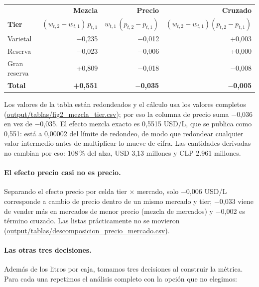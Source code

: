\begin{center}
\small
\begin{tabular}{l r r r}
\hline
& \textbf{Mezcla} & \textbf{Precio} & \textbf{Cruzado} \\
\textbf{Tier} & $(w_{t,2} - w_{t,1})\, p_{t,1}$ & $w_{t,1}\,(p_{t,2} - p_{t,1})$ & $(w_{t,2} - w_{t,1})(p_{t,2} - p_{t,1})$ \\
\hline
Varietal     & $-$0,235 & $-$0,012 & +0,003 \\
Reserva      & $-$0,023 & $-$0,006 & +0,000 \\
Gran reserva & +0,809   & $-$0,018 & $-$0,008 \\
\hline
\textbf{Total} & \textbf{+0,551} & \textbf{$-$0,035} & \textbf{$-$0,005} \\
\hline
\end{tabular}
\end{center}

\noindent Los valores de la tabla están redondeados y el cálculo usa los valores completos (\url{output/tablas/fig2_mezcla_tier.csv}); por eso la columna de precio suma $-$0,036 en vez de $-$0,035. El efecto mezcla exacto es 0,5515 USD/L, que se publica como 0,551: está a 0,00002 del límite de redondeo, de modo que redondear cualquier valor intermedio antes de multiplicar lo mueve de cifra. Las cantidades derivadas no cambian por eso: 108\,\% del alza, USD 3,13 millones y CLP 2.961 millones.

\paragraph{El efecto precio casi no es precio.} Separando el efecto precio por celda tier $\times$ mercado, solo $-$0,006 USD/L corresponde a cambio de precio dentro de un mismo mercado y tier; $-$0,033 viene de vender más en mercados de menor precio (mezcla de mercados) y $-$0,002 es término cruzado. Las listas prácticamente no se movieron (\url{output/tablas/descomposicion_precio_mercado.csv}).

\paragraph{Las otras tres decisiones.} Además de los litros por caja, tomamos tres decisiones al construir la métrica. Para cada una repetimos el análisis completo con la opción que no elegimos:

